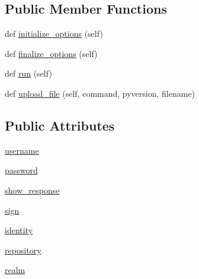 \subsection*{Public Member Functions}
\begin{DoxyCompactItemize}
\item 
def \hyperlink{classsetuptools_1_1__distutils_1_1command_1_1upload_1_1upload_a5c5a263131bac9539a620ed711b280f5}{initialize\+\_\+options} (self)
\item 
def \hyperlink{classsetuptools_1_1__distutils_1_1command_1_1upload_1_1upload_a9fd2eee54f8706981edd31defe4f40c9}{finalize\+\_\+options} (self)
\item 
def \hyperlink{classsetuptools_1_1__distutils_1_1command_1_1upload_1_1upload_a80aaf584fa05adbebd1ebcf4b6d45291}{run} (self)
\item 
def \hyperlink{classsetuptools_1_1__distutils_1_1command_1_1upload_1_1upload_a91db9f86792f17b4e69542a506156290}{upload\+\_\+file} (self, command, pyversion, filename)
\end{DoxyCompactItemize}
\subsection*{Public Attributes}
\begin{DoxyCompactItemize}
\item 
\hyperlink{classsetuptools_1_1__distutils_1_1command_1_1upload_1_1upload_ad368d4b122b82c0a82ab07d64a2e8b32}{username}
\item 
\hyperlink{classsetuptools_1_1__distutils_1_1command_1_1upload_1_1upload_a54ad6a39cdb1cd646ff81c2b9d2ae1a5}{password}
\item 
\hyperlink{classsetuptools_1_1__distutils_1_1command_1_1upload_1_1upload_aefa14b0719666a59496371d3819d41a7}{show\+\_\+response}
\item 
\hyperlink{classsetuptools_1_1__distutils_1_1command_1_1upload_1_1upload_a50949b1ade16967746c53f1bd0a9ccd9}{sign}
\item 
\hyperlink{classsetuptools_1_1__distutils_1_1command_1_1upload_1_1upload_a8584595641e5d577d3dfb83cf35ab14e}{identity}
\item 
\hyperlink{classsetuptools_1_1__distutils_1_1command_1_1upload_1_1upload_aef0b36af5e73f471244f1763b5eeed46}{repository}
\item 
\hyperlink{classsetuptools_1_1__distutils_1_1command_1_1upload_1_1upload_a7f8c7365c31707b815ae317ba66105b0}{realm}
\end{DoxyCompactItemize}
